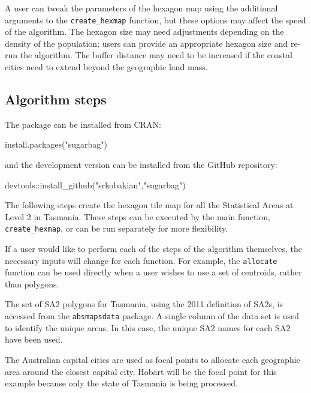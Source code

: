 A user can tweak the parameters of the hexagon map using the additional
arguments to the \texttt{create\_hexmap} function, but these options may
affect the speed of the algorithm. The hexagon size may need adjustments
depending on the density of the population; users can provide an
appropriate hexagon size and re-run the algorithm. The buffer distance
may need to be increased if the coastal cities need to extend beyond the
geographic land mass.

\hypertarget{algorithm-steps}{%
\subsection{Algorithm steps}\label{algorithm-steps}}

The package can be installed from CRAN:

\begin{Schunk}
\begin{Sinput}
install.packages("sugarbag")
\end{Sinput}
\end{Schunk}

and the development version can be installed from the GitHub repository:

\begin{Schunk}
\begin{Sinput}
devtools::install_github("srkobakian","sugarbag")
\end{Sinput}
\end{Schunk}

The following steps create the hexagon tile map for all the Statistical
Areas at Level 2 in Tasmania. These steps can be executed by the main
function, \texttt{create\_hexmap}, or can be run separately for more
flexibility.

If a user would like to perform each of the steps of the algorithm
themselves, the necessary inputs will change for each function. For
example, the \texttt{allocate} function can be used directly when a user
wishes to use a set of centroids, rather than polygons.

The set of SA2 polygons for Tasmania, using the 2011 definition of SA2s,
is accessed from the \texttt{absmapsdata} package. A single column of
the data set is used to identify the unique areas. In this case, the
unique SA2 names for each SA2 have been used.

The Australian capital cities are used as focal points to allocate each
geographic area around the closest capital city. Hobart will be the
focal point for this example because only the state of Tasmania is being
processed.

